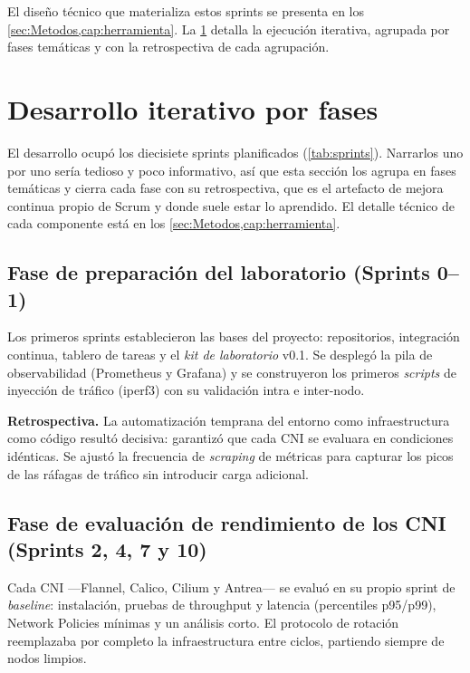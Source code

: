 El diseño técnico que materializa estos sprints se presenta en los \cref{sec:Metodos,cap:herramienta}. La \cref{sec:desarrollo} detalla la ejecución iterativa, agrupada por fases temáticas y con la retrospectiva de cada agrupación.

\section{Desarrollo iterativo por fases} \label{sec:desarrollo}

El desarrollo ocupó los diecisiete sprints planificados (\cref{tab:sprints}). Narrarlos uno por uno sería tedioso y poco informativo, así que esta sección los agrupa en fases temáticas y cierra cada fase con su retrospectiva, que es el artefacto de mejora continua propio de Scrum y donde suele estar lo aprendido. El detalle técnico de cada componente está en los \cref{sec:Metodos,cap:herramienta}.

\subsection{Fase de preparación del laboratorio (Sprints 0--1)}

Los primeros sprints establecieron las bases del proyecto: repositorios, integración continua, tablero de tareas y el \emph{kit de laboratorio} v0.1. Se desplegó la pila de observabilidad (Prometheus y Grafana) y se construyeron los primeros \emph{scripts} de inyección de tráfico (iperf3) con su validación intra e inter-nodo.

\textbf{Retrospectiva.} La automatización temprana del entorno como infraestructura como código resultó decisiva: garantizó que cada CNI se evaluara en condiciones idénticas. Se ajustó la frecuencia de \emph{scraping} de métricas para capturar los picos de las ráfagas de tráfico sin introducir carga adicional.

\subsection{Fase de evaluación de rendimiento de los CNI (Sprints 2, 4, 7 y 10)}

Cada CNI ---Flannel, Calico, Cilium y Antrea--- se evaluó en su propio sprint de \emph{baseline}: instalación, pruebas de throughput y latencia (percentiles p95/p99), Network Policies mínimas y un análisis corto. El protocolo de rotación reemplazaba por completo la infraestructura entre ciclos, partiendo siempre de nodos limpios.

